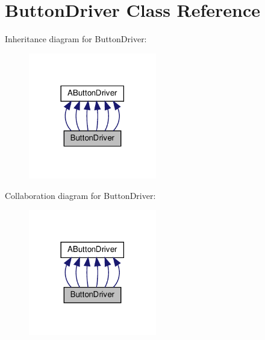 \hypertarget{classButtonDriver}{}\section{Button\+Driver Class Reference}
\label{classButtonDriver}


Inheritance diagram for Button\+Driver\+:
\nopagebreak
\begin{figure}[H]
\begin{center}
\leavevmode
\includegraphics[width=158pt]{classButtonDriver__inherit__graph}
\end{center}
\end{figure}


Collaboration diagram for Button\+Driver\+:
\nopagebreak
\begin{figure}[H]
\begin{center}
\leavevmode
\includegraphics[width=158pt]{classButtonDriver__coll__graph}
\end{center}
\end{figure}
